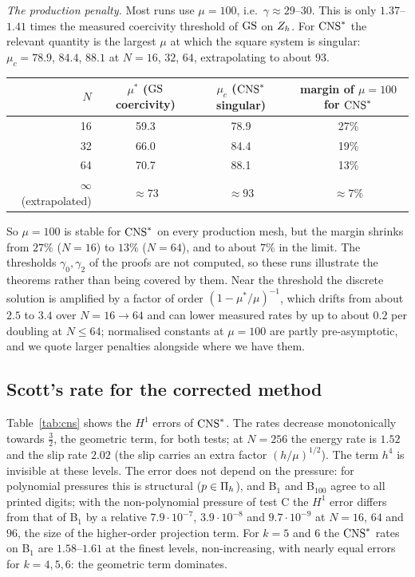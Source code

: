 \emph{The production penalty.} Most runs use $\mu=100$, i.e.\ $\gamma\approx29$--$30$. This is only $1.37$--$1.41$ times the measured coercivity threshold of $\mathrm{GS}$ on $Z_h$. For $\mathrm{CNS}^\ast$ the relevant quantity is the largest $\mu$ at which the square system is singular: $\mu_c=78.9$, $84.4$, $88.1$ at $N=16$, $32$, $64$, extrapolating to about $93$. \begin{center}\small
\begin{tabular}{rccc}
\toprule
$N$ & $\mu^\ast$ ($\mathrm{GS}$ coercivity) & $\mu_c$ ($\mathrm{CNS}^\ast$ singular) & margin of $\mu=100$ for $\mathrm{CNS}^\ast$\\
\midrule
16 & 59.3 & 78.9 & 27\%\\
32 & 66.0 & 84.4 & 19\%\\
64 & 70.7 & 88.1 & 13\%\\
$\infty$ (extrapolated) & $\approx73$ & $\approx93$ & $\approx7\%$\\
\bottomrule
\end{tabular}
\end{center}
So $\mu=100$ is stable for $\mathrm{CNS}^\ast$ on every production mesh, but the margin shrinks from $27\%$ ($N=16$) to $13\%$ ($N=64$), and to about $7\%$ in the limit. The thresholds $\gamma_0,\gamma_2$ of the proofs are not computed, so these runs illustrate the theorems rather than being covered by them. Near the threshold the discrete solution is amplified by a factor of order $(1-\mu^\ast/\mu)^{-1}$, which drifts from about $2.5$ to $3.4$ over $N=16\to64$ and can lower measured rates by up to about $0.2$ per doubling at $N\le64$; normalised constants at $\mu=100$ are partly pre-asymptotic, and we quote larger penalties alongside where we have them.

\subsection{Scott's rate for the corrected method}
Table~\ref{tab:cns} shows the $H^1$ errors of $\mathrm{CNS}^\ast$. The rates decrease monotonically towards $\frac32$, the geometric term, for both tests; at $N=256$ the energy rate is $1.52$ and the slip rate $2.02$ (the slip carries an extra factor $(h/\mu)^{1/2}$). The term $h^4$ is invisible at these levels. The error does not depend on the pressure: for polynomial pressures this is structural ($p\in\Pi_h$), and B$_1$ and B$_{100}$ agree to all printed digits; with the non-polynomial pressure of test C the $H^1$ error differs from that of B$_1$ by a relative $7.9\cdot10^{-7}$, $3.9\cdot10^{-8}$ and $9.7\cdot10^{-9}$ at $N=16$, $64$ and $96$, the size of the higher-order projection term. For $k=5$ and $6$ the $\mathrm{CNS}^\ast$ rates on B$_1$ are $1.58$--$1.61$ at the finest levels, non-increasing, with nearly equal errors for $k=4,5,6$: the geometric term dominates.

